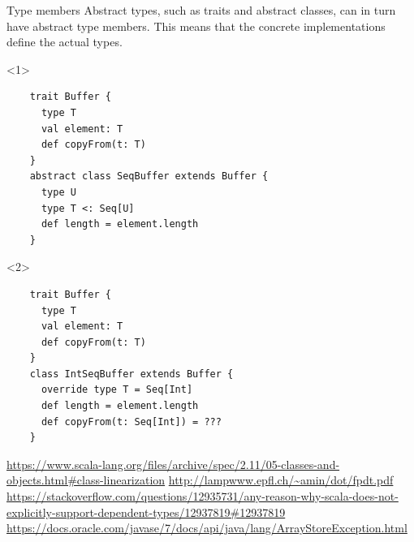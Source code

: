 \documentclass[aspectratio=169]{beamer}
\begin{document}
\begin{frame}[fragile]{Type members}
  Abstract types, such as traits and abstract classes, can in turn have abstract type members. This
  means that the concrete implementations define the actual types.
  \begin{onlyenv}<1>
      \begin{verbatim}
    trait Buffer {
      type T
      val element: T
      def copyFrom(t: T)
    }
    abstract class SeqBuffer extends Buffer {
      type U
      type T <: Seq[U]
      def length = element.length
    }
      \end{verbatim}
  \end{onlyenv}
  \begin{onlyenv}<2>
      \begin{verbatim}
    trait Buffer {
      type T
      val element: T
      def copyFrom(t: T)
    }
    class IntSeqBuffer extends Buffer {
      override type T = Seq[Int]
      def length = element.length
      def copyFrom(t: Seq[Int]) = ???
    }
      \end{verbatim}
  \end{onlyenv}
\end{frame}



\begin{thebibliography}{9}
  \url{https://www.scala-lang.org/files/archive/spec/2.11/05-classes-and-objects.html#class-linearization}
  \url{http://lampwww.epfl.ch/~amin/dot/fpdt.pdf}
  \url{https://stackoverflow.com/questions/12935731/any-reason-why-scala-does-not-explicitly-support-dependent-types/12937819#12937819}
  \url{https://docs.oracle.com/javase/7/docs/api/java/lang/ArrayStoreException.html}
\end{thebibliography}
\end{document}
